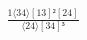 \documentclass[varwidth, border=5pt]{standalone}
\begin{document}
\begin{my}
$\begin{gathered}
\scriptscriptstyle\frac{1⟨34⟩[13]²[24]}{⟨24⟩[34]³}
\end{gathered}$
\end{my}
\end{document}
